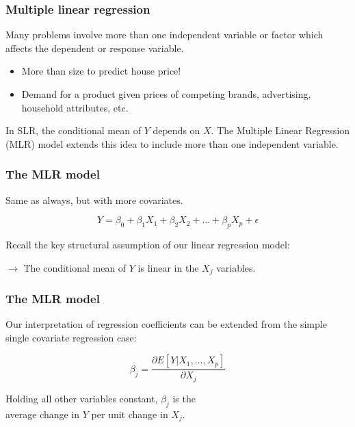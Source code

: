 \documentclass{beamer}
\newcommand{\bl}{\color{lightblue}}
\newcommand{\rd}{\color{burntorange}}
\newcommand{\bk}{\color{black}}
\newcommand{\bi}{\begin{itemize}}
\newcommand{\ib}{\end{itemize}}
\newcommand{\p}{\item}
\newcommand{\sk}{\vspace{.5cm}}
\begin{document}
\begin{frame}
\frametitle{Multiple linear regression}

Many problems involve more than one independent variable 
or factor which affects the dependent or response variable.

\sk
\bi 
\p More than size to predict house price!
\p Demand for a product given prices of competing brands, 
advertising, household attributes, etc.
\ib 

\sk
In SLR, the conditional mean of $Y$ depends on $X$. The 
Multiple Linear Regression (MLR) model extends this idea to include more 
than one independent variable.
\end{frame}

\begin{frame}
\frametitle{The MLR model}

\sk
Same as always, but with more covariates.

{\bl  \large
\[ Y = \beta_0 + \beta_1 X_1 + \beta_2 X_2 + \dots + \beta_p X_p + \epsilon 
\]}

Recall the key structural assumption of our linear regression model: \\ \sk


$\rightarrow$ The conditional mean of $Y$ is \rd linear \bk in the $X_j$ variables. \\ \sk
%
%

\end{frame}



\begin{frame}
\frametitle{The MLR model}  

Our interpretation of regression coefficients can be extended from the
simple  single covariate regression case: \sk

{\bl  \large 
\[ \beta_j = \frac{\partial E[Y | X_1,\ldots,X_p]}{\partial X_j} \] }
\sk
\begin{center}\rd \vspace{-.3cm}
Holding all other variables constant\bk, $\beta_j$ is the \\
average  change in $Y$ per unit change in $X_j$.
\end{center}

\end{frame}
\end{document}
